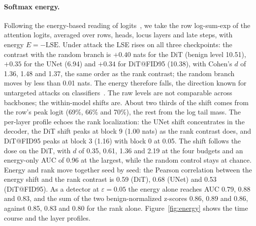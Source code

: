 \documentclass{article}
\begin{document}
\paragraph{Softmax energy.} Following the energy-based reading of logits~\cite{grathwohl2020your}, we take the row log-sum-exp of the attention logits, averaged over rows, heads, locus layers and late steps, with energy $E = -\mathrm{LSE}$. Under attack the LSE rises on all three checkpoints: the contrast with the random branch is $+0.40$ nats for the DiT (benign level 10.51), $+0.35$ for the UNet (6.94) and $+0.34$ for DiT@FID95 (10.38), with Cohen's $d$ of 1.36, 1.48 and 1.37, the same order as the rank contrast; the random branch moves by less than 0.01 nats. The energy therefore falls, the direction known for untargeted attacks on classifiers~\cite{mirza2024shedding}. The raw levels are not comparable across backbones; the within-model shifts are. About two thirds of the shift comes from the row's peak logit (69\%, 66\% and 70\%), the rest from the log tail mass. The per-layer profile echoes the rank localization: the UNet shift concentrates in the decoder, the DiT shift peaks at block 9 (1.00 nats) as the rank contrast does, and DiT@FID95 peaks at block 3 (1.16) with block 0 at 0.05. The shift follows the dose on the DiT, with $d$ of 0.35, 0.61, 1.36 and 2.19 at the four budgets and an energy-only AUC of 0.96 at the largest, while the random control stays at chance. Energy and rank move together seed by seed: the Pearson correlation between the energy shift and the rank contrast is 0.59 (DiT), 0.68 (UNet) and 0.53 (DiT@FID95). As a detector at $\varepsilon{=}0.05$ the energy alone reaches AUC 0.79, 0.88 and 0.83, and the sum of the two benign-normalized z-scores 0.86, 0.89 and 0.86, against 0.85, 0.83 and 0.80 for the rank alone. Figure~\ref{fig:energy} shows the time course and the layer profiles.
\end{document}
